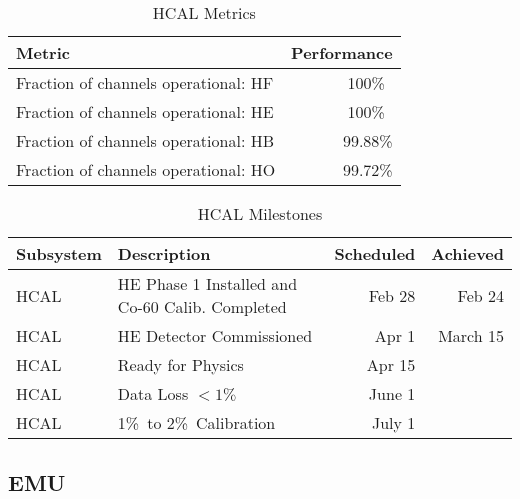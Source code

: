 \documentclass[12pt]{article}
\begin{document}
\begin{table}[htp]
\caption{HCAL Metrics}
\begin{center}
\begin{tabular}{|l|r|}
\hline
Metric&Performance\\
\hline
Fraction of channels operational: HF& 100\%\ \\
\hline
Fraction of channels operational: HE& 100\%\ \\
\hline
Fraction of channels operational: HB& 99.88\% \\
\hline
Fraction of channels operational: HO& 99.72\%  \\
\hline
\end{tabular}
\end{center}
\label{HCALMetrics}
\end{table}%


\begin{table}[htp]
\caption{HCAL Milestones}
\begin{center}
\begin{tabular}{|l|l|r|r|}
\hline
Subsystem&Description&Scheduled&Achieved\\
\hline
HCAL& HE Phase 1 Installed and Co-60 Calib. Completed & Feb 28 &  Feb 24 \\
\hline
HCAL& HE Detector Commissioned & Apr 1 &  March 15 \\
\hline
HCAL& Ready for Physics & Apr 15 & \\
\hline
HCAL& Data Loss $<  1\%\ $  & June 1  & \\
\hline
HCAL& 1\%\ to  2\%\  Calibration & July 1   & \\
\hline
\end{tabular}
\end{center}
\label{HCALMilestones}
\end{table}%






\subsection{EMU }
\end{document}

